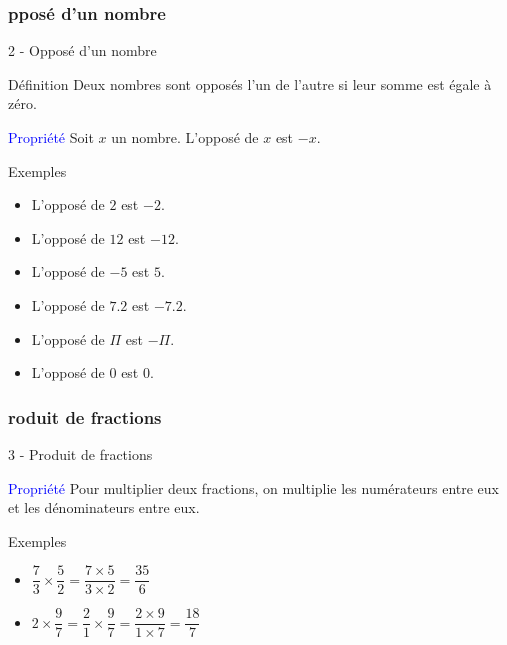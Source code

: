 \documentclass{beamer}
\begin{document}
\begin{frame}
  \frametitle{pposé d'un nombre}

  \alert{2 - Opposé d'un nombre}

  \begin{alertblock}{Définition}
    Deux nombres sont \alert{opposés} l'un de l'autre si leur somme est égale à zéro.
  \end{alertblock}

  \begin{block}{\textcolor{blue}{Propriété}}
    Soit $x$ un nombre. L'opposé de $x$ est $-x$.
  \end{block}

  \begin{exampleblock}{Exemples}

    \begin{multicols}{2}
      \begin{itemize}
      \item L'opposé de $2$ est $-2$.
      \item L'opposé de $12$ est $-12$.
      \item L'opposé de $-5$ est $5$.
      \item L'opposé de $7.2$ est $-7.2$.
      \item L'opposé de $\Pi$ est $-\Pi$.
      \item L'opposé de $0$ est $0$.
      \end{itemize}
    \end{multicols}
  \end{exampleblock}
\end{frame}

\begin{frame}
  \frametitle{roduit de fractions}
  
  \alert{3 - Produit de fractions}
  
  \begin{block}{\textcolor{blue}{Propriété}}
    Pour multiplier deux fractions, on multiplie les numérateurs entre eux et les dénominateurs entre eux.
  \end{block}
  
  \begin{exampleblock}{Exemples}
    
    \begin{itemize}
    \item $\dfrac{7}{3} \times \dfrac{5}{2} = \dfrac{7 \times 5}{3 \times 2} = \dfrac{35}{6}$
    \item $2 \times \dfrac{9}{7} = \dfrac{2}{1} \times \dfrac{9}{7} = \dfrac{2 \times 9}{1 \times 7} = \dfrac{18}{7}$
    \end{itemize}
    
  \end{exampleblock}
\end{frame}
\end{document}
